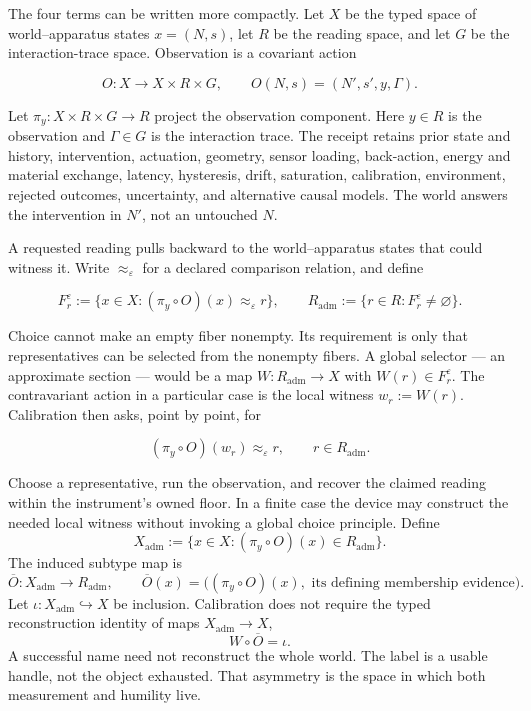 \documentclass[12pt,oneside]{book}
\begin{document}
The four terms can be written more compactly. Let \(X\) be the typed space of world--apparatus states
\(x=(N,s)\), let \(R\) be the reading space, and let \(G\) be the interaction-trace space. Observation is a
covariant action

\[
O:X\longrightarrow X\times R\times G,\qquad
O(N,s)=(N',s',y,\Gamma).
\]

Let \(\pi_y:X\times R\times G\to R\) project the observation component. Here \(y\in R\) is the observation and
\(\Gamma\in G\) is the interaction trace. The receipt retains prior state and
history, intervention, actuation, geometry, sensor loading, back-action, energy and material exchange, latency,
hysteresis, drift, saturation, calibration, environment, rejected outcomes, uncertainty, and alternative causal
models. The world answers the intervention in \(N'\), not an untouched \(N\).

A requested reading pulls backward to the world--apparatus states that could witness it. Write
\(\approx_{\varepsilon}\) for a declared comparison relation, and define

\[
F_r^{\varepsilon}
  := \{x\in X : (\pi_y\circ O)(x) \approx_{\varepsilon} r\},
\qquad
R_{\mathrm{adm}}
  := \{r \in R : F_r^{\varepsilon} \neq \varnothing\}.
\]

Choice cannot make an empty fiber nonempty. Its requirement is only that representatives can be selected from the
nonempty fibers. A global selector --- an approximate section --- would be a map
\(W : R_{\mathrm{adm}} \longrightarrow X\) with
\(W(r) \in F_r^{\varepsilon}\). The contravariant action in a particular case is the local witness
\(w_r := W(r)\). Calibration then asks, point by point, for

\[
(\pi_y\circ O)(w_r) \approx_{\varepsilon} r,
\qquad r \in R_{\mathrm{adm}}.
\]

Choose a representative, run the observation, and recover the claimed reading within the instrument's owned floor. In
a finite case the device may construct the needed local witness without invoking a global choice principle. Define
\[
X_{\mathrm{adm}}:=\{x\in X:(\pi_y\circ O)(x)\in R_{\mathrm{adm}}\}.
\]
The induced subtype map is
\[
\overline O:X_{\mathrm{adm}}\longrightarrow R_{\mathrm{adm}},\qquad
\overline O(x)=\bigl((\pi_y\circ O)(x),\text{ its defining membership evidence}\bigr).
\]
Let \(\iota:X_{\mathrm{adm}}\hookrightarrow X\) be inclusion. Calibration does not require the typed reconstruction
identity of maps \(X_{\mathrm{adm}}\to X\),
\[
W\circ\overline O=\iota.
\]
A successful name need not reconstruct the whole world. The label is a usable handle, not the object exhausted. That
asymmetry is the space in which both measurement and humility live.
\end{document}
